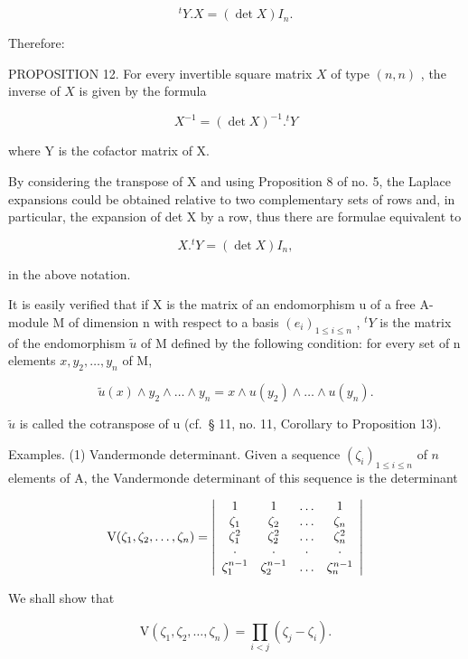 \[
{ } ^ { t } Y . X = ( \operatorname * { d e t } X ) I _ { n } .\tag{26}
\]

Therefore:

PROPOSITION 12. For every invertible square matrix \(X\) of type \((n, n)\) , the inverse of \(X\) is given by the formula

\[
X ^ {- 1} = (\det X) ^ {- 1}. ^ {t} Y\tag{27}
\]

where Y is the cofactor matrix of X.

By considering the transpose of X and using Proposition 8 of no. 5, the Laplace expansions could be obtained relative to two complementary sets of rows and, in particular, the expansion of det X by a row, thus there are formulae equivalent to

\[
X. ^ {t} Y = (\det X) I _ {n},\tag{28}
\]

in the above notation.

It is easily verified that if X is the matrix of an endomorphism u of a free A-module M of dimension n with respect to a basis \((e_{i})_{1\leq i\leq n}\) , \(^{t}Y\) is the matrix of the endomorphism \(\tilde{u}\) of M defined by the following condition: for every set of n elements \(x, y_{2}, \ldots, y_{n}\) of M,

\[
\tilde {u} (x) \wedge y _ {2} \wedge \dots \wedge y _ {n} = x \wedge u (y _ {2}) \wedge \dots \wedge u (y _ {n}).
\]

\(\tilde{u}\) is called the cotranspose of u (cf.~§ 11, no. 11, Corollary to Proposition 13).

Examples. (1) Vandermonde determinant. Given a sequence \((\zeta_{i})_{1\leqslant i\leqslant n}\) of \(n\) elements of A, the Vandermonde determinant of this sequence is the determinant

\[
\mathrm{V} (\zeta_ {1}, \zeta_ {2}, \dots , \zeta_ {n}) = \left| \begin{array}{c c c c} 1 & 1 & \dots & 1 \\ \zeta_ {1} & \zeta_ {2} & \dots & \zeta_ {n} \\ \zeta_ {1} ^ {2} & \zeta_ {2} ^ {2} & \dots & \zeta_ {n} ^ {2} \\ \cdot & \cdot & \cdot & \cdot \\ \zeta_ {1} ^ {n - 1} & \zeta_ {2} ^ {n - 1} & \dots & \zeta_ {n} ^ {n - 1} \end{array} \right|
\]

We shall show that

\[
\mathrm{V} \left(\zeta_ {1}, \zeta_ {2}, \dots , \zeta_ {n}\right) = \prod_ {i <   j} \left(\zeta_ {j} - \zeta_ {i}\right).\tag{29}
\]

